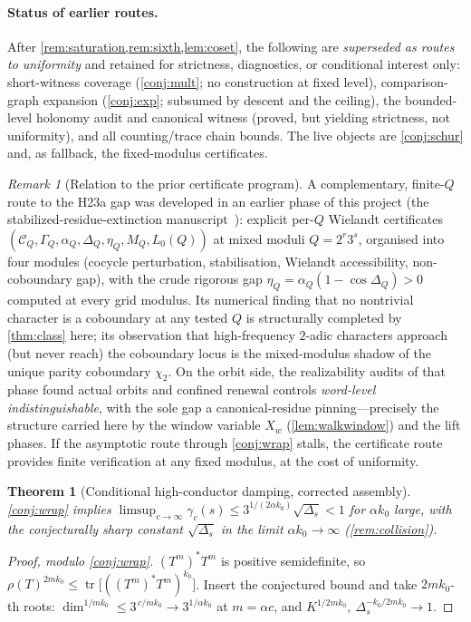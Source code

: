 \documentclass[11pt]{article}
\theoremstyle{plain}
\newtheorem{theorem}{Theorem}
\theoremstyle{definition}
\theoremstyle{remark}
\newtheorem*{remark}{Remark}
\begin{document}
\paragraph{Status of earlier routes.} After
\cref{rem:saturation,rem:sixth,lem:coset}, the following are \emph{superseded
as routes to uniformity} and retained for strictness, diagnostics, or
conditional interest only: short-witness coverage (\cref{conj:mult}; no
construction at fixed level), comparison-graph expansion (\cref{conj:exp};
subsumed by descent and the ceiling), the bounded-level holonomy audit and
canonical witness (proved, but yielding strictness, not uniformity), and all
counting/trace chain bounds. The live objects are \cref{conj:schur} and, as
fallback, the fixed-modulus certificates.

\begin{remark}[Relation to the prior certificate program]
A complementary, finite-$Q$ route to the H23a gap was developed in an earlier
phase of this project (the stabilized-residue-extinction
manuscript~\cite{srce}): explicit
per-$Q$ Wielandt certificates $(\mathcal C_Q,\Gamma_Q,\alpha_Q,\Delta_Q,
\eta_Q,M_Q,L_0(Q))$ at mixed moduli $Q=2^r3^s$, organised into four modules
(cocycle perturbation, stabilisation, Wielandt accessibility, non-coboundary
gap), with the crude rigorous gap $\eta_Q=\alpha_Q(1-\cos\Delta_Q)>0$ computed
at every grid modulus. Its numerical finding that no nontrivial character is a
coboundary at any tested $Q$ is structurally completed by
\cref{thm:class} here; its observation that high-frequency $2$-adic characters
approach (but never reach) the coboundary locus is the mixed-modulus shadow of
the unique parity coboundary $\chi_2$. On the orbit side, the realizability
audits of that phase found actual orbits and confined renewal controls
\emph{word-level indistinguishable}, with the sole gap a canonical-residue
pinning---precisely the structure carried here by the window variable $X_w$
(\cref{lem:walkwindow}) and the lift phases. If the asymptotic route through
\cref{conj:wrap} stalls, the certificate route provides finite verification at
any fixed modulus, at the cost of uniformity.
\end{remark}

\begin{theorem}[Conditional high-conductor damping, corrected assembly]
\label{thm:assembly}
\cref{conj:wrap} implies
$\limsup_{c\to\infty}\gamma_c(s)\le3^{1/(2\alpha k_0)}\sqrt{\Delta_s}<1$ for
$\alpha k_0$ large, with the conjecturally sharp constant $\sqrt{\Delta_s}$ in
the limit $\alpha k_0\to\infty$ (\cref{rem:collision}).
\end{theorem}
\begin{proof}[Proof, modulo \cref{conj:wrap}]
$(T^m)^*T^m$ is positive semidefinite, so
$\rho(T)^{2mk_0}\le\operatorname{tr}\bigl[((T^m)^*T^m)^{k_0}\bigr]$. Insert the
conjectured bound and take $2mk_0$-th roots:
$\dim^{1/mk_0}\le3^{\,c/mk_0}\to3^{1/\alpha k_0}$ at $m=\alpha c$, and
$K^{1/2mk_0},\ \Delta_s^{-k_0/2mk_0}\to1$.
\end{proof}
\end{document}

